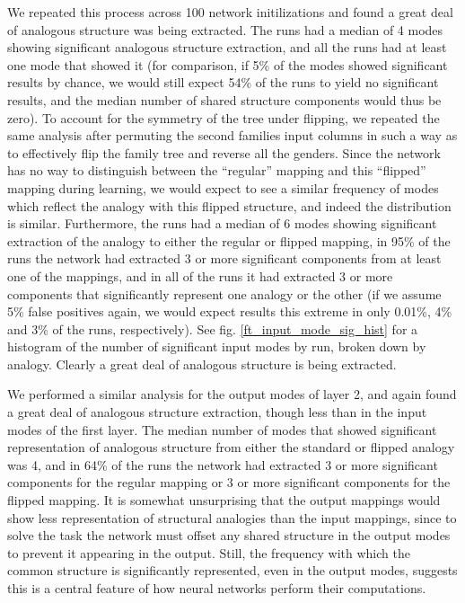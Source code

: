 \documentclass[10pt,letterpaper]{article}
\begin{document}
We repeated this process across 100 network initilizations and found a great deal of analogous structure was being extracted. The runs had a median of 4 modes showing significant analogous structure extraction, and all the runs had at least one mode that showed it (for comparison, if 5\% of the modes showed significant results by chance, we would still expect 54\% of the runs to yield no significant results, and the median number of shared structure components would thus be zero). To account for the symmetry of the tree under flipping, we repeated the same analysis after permuting the second families input columns in such a way as to effectively flip the family tree and reverse all the genders. Since the network has no way to distinguish between the ``regular'' mapping and this ``flipped'' mapping during learning, we would expect to see a similar frequency of modes which reflect the analogy with this flipped structure, and indeed the distribution is similar. Furthermore, the runs had a median of 6 modes showing significant extraction of the analogy to either the regular or flipped mapping, in 95\% of the runs the network had extracted 3 or more significant components from at least one of the mappings, and in all of the runs it had extracted 3 or more components that significantly represent one analogy or the other (if we assume 5\% false positives again, we would expect results this extreme in only 0.01\%, 4\% and 3\% of the runs, respectively). See fig. \ref{ft_input_mode_sig_hist} for a histogram of the number of significant input modes by run, broken down by analogy. Clearly a great deal of analogous structure is being extracted. \par
We performed a similar analysis for the output modes of layer 2, and again found a great deal of analogous structure extraction, though less than in the input modes of the first layer. The median number of modes that showed significant representation of analogous structure from either the standard or flipped analogy was 4, and in 64\% of the runs the network had extracted 3 or more significant components for the regular mapping or 3 or more significant components for the flipped mapping. It is somewhat unsurprising that the output mappings would show less representation of structural analogies than the input mappings, since to solve the task the network must offset any shared structure in the output modes to prevent it appearing in the output. Still, the frequency with which the common structure is significantly represented, even in the output modes, suggests this is a central feature of how neural networks perform their computations.  \par  
\end{document}
